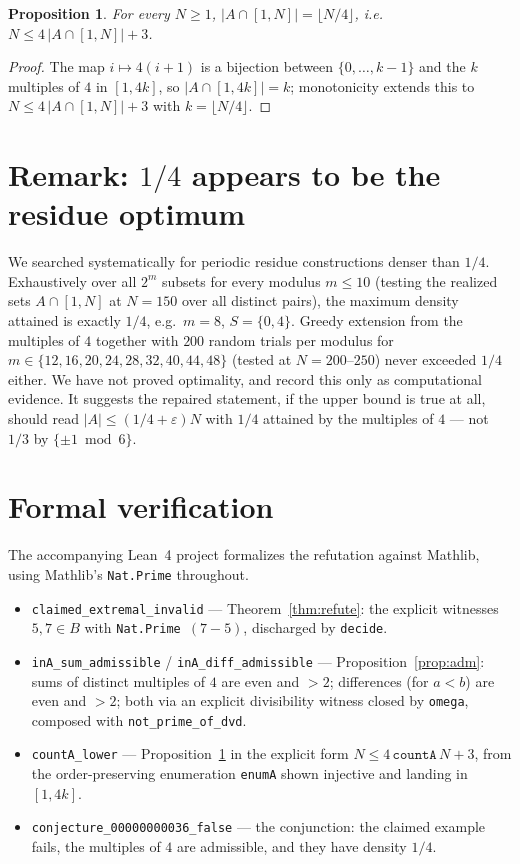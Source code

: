 \documentclass[11pt]{article}
\theoremstyle{plain}
\newtheorem{proposition}[theorem]{Proposition}
\theoremstyle{definition}
\theoremstyle{remark}
\begin{document}
\begin{proposition}\label{prop:count}
For every $N\ge1$, $|A\cap[1,N]|=\lfloor N/4\rfloor$, i.e.\ $N\le
4\,|A\cap[1,N]|+3$.
\end{proposition}

\begin{proof}
The map $i\mapsto4(i+1)$ is a bijection between $\{0,\ldots,k-1\}$ and the
$k$ multiples of $4$ in $[1,4k]$, so $|A\cap[1,4k]|=k$; monotonicity extends
this to $N\le4\,|A\cap[1,N]|+3$ with $k=\lfloor N/4\rfloor$.
\end{proof}

\section{Remark: $1/4$ appears to be the residue optimum}

We searched systematically for periodic residue constructions denser than $1/4$.
Exhaustively over all $2^m$ subsets for every modulus $m\le10$ (testing the
realized sets $A\cap[1,N]$ at $N=150$ over all distinct pairs), the maximum
density attained is exactly $1/4$, e.g.\ $m=8$, $S=\{0,4\}$. Greedy extension
from the multiples of $4$ together with $200$ random trials per modulus for
$m\in\{12,16,20,24,28,32,40,44,48\}$ (tested at $N=200$--$250$) never exceeded
$1/4$ either. We have not proved optimality, and record this only as
computational evidence. It suggests the repaired statement, if the upper bound
is true at all, should read $|A|\le(1/4+\varepsilon)N$ with $1/4$ attained by
the multiples of $4$ --- not $1/3$ by $\{\pm1\bmod6\}$.

\section{Formal verification}

The accompanying Lean~4 project formalizes the refutation against Mathlib,
using Mathlib's \texttt{Nat.Prime} throughout.

\begin{itemize}
  \item \texttt{claimed\_extremal\_invalid} --- Theorem~\ref{thm:refute}: the
    explicit witnesses $5,7\in B$ with \texttt{Nat.Prime}~$(7-5)$, discharged
    by \texttt{decide}.
  \item \texttt{inA\_sum\_admissible} / \texttt{inA\_diff\_admissible} ---
    Proposition~\ref{prop:adm}: sums of distinct multiples of $4$ are even and
    $>2$; differences (for $a<b$) are even and $>2$; both via an explicit
    divisibility witness closed by \texttt{omega}, composed with
    \texttt{not\_prime\_of\_dvd}.
  \item \texttt{countA\_lower} --- Proposition~\ref{prop:count} in the explicit
    form $N\le4\,\texttt{countA}\,N+3$, from the order-preserving enumeration
    \texttt{enumA} shown injective and landing in $[1,4k]$.
  \item \texttt{conjecture\_00000000036\_false} --- the conjunction: the
    claimed example fails, the multiples of $4$ are admissible, and they have
    density $1/4$.
\end{itemize}
\end{document}
